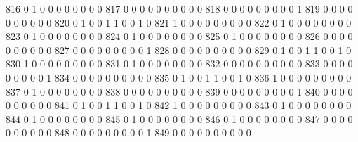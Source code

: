 \documentclass[compress,8pt]{beamer}
\begin{document}
\begin{frame}
\begin{Schunk}
  816      0       1   0              0        0    0       0       0   0   0
  817      0       0   0              0        0    0       0       0   0   0
  818      0       0   0              0        0    0       0       0   0   1
  819      0       0   0              0        0    0       0       0   0   0
  820      0       1   0              0        1    1       0       0   1   0
  821      1       0   0              0        0    0       0       0   0   0
  822      0       1   0              0        0    0       0       0   0   0
  823      0       1   0              0        0    0       0       0   0   0
  824      0       1   0              0        0    0       0       0   0   0
  825      0       1   0              0        0    0       0       0   0   0
  826      0       0   0              0        0    0       0       0   0   0
  827      0       0   0              0        0    0       0       0   0   1
  828      0       0   0              0        0    0       0       0   0   0
  829      0       1   0              0        1    1       0       0   1   0
  830      1       0   0              0        0    0       0       0   0   0
  831      0       1   0              0        0    0       0       0   0   0
  832      0       0   0              0        0    0       0       0   0   0
  833      0       0   0              0        0    0       0       0   0   1
  834      0       0   0              0        0    0       0       0   0   0
  835      0       1   0              0        1    1       0       0   1   0
  836      1       0   0              0        0    0       0       0   0   0
  837      0       1   0              0        0    0       0       0   0   0
  838      0       0   0              0        0    0       0       0   0   0
  839      0       0   0              0        0    0       0       0   0   1
  840      0       0   0              0        0    0       0       0   0   0
  841      0       1   0              0        1    1       0       0   1   0
  842      1       0   0              0        0    0       0       0   0   0
  843      0       1   0              0        0    0       0       0   0   0
  844      0       1   0              0        0    0       0       0   0   0
  845      0       1   0              0        0    0       0       0   0   0
  846      0       1   0              0        0    0       0       0   0   0
  847      0       0   0              0        0    0       0       0   0   0
  848      0       0   0              0        0    0       0       0   0   1
  849      0       0   0              0        0    0       0       0   0   0

\end{Schunk}
\end{frame}
\end{document}
